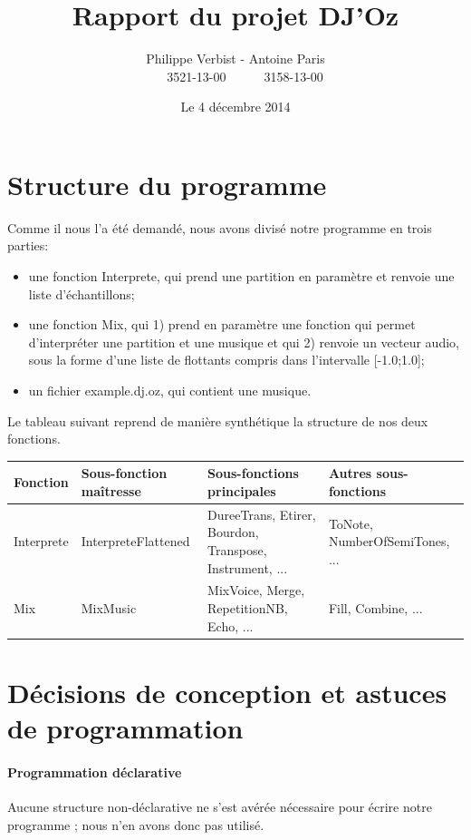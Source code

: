 \documentclass[10pt,a4paper]{article}
\author{Philippe Verbist - Antoine Paris \\ \ \ \ 3521-13-00\ \ \ \ \ \ 3158-13-00}
\title{\textbf{Rapport du projet DJ'Oz}}
\date{Le 4 décembre 2014}
\begin{document}
\sloppy
\maketitle

\section{Structure du programme}
Comme il nous l'a été demandé, nous avons divisé notre programme en trois parties:
\begin{itemize}
	\item une fonction Interprete, qui prend une partition en paramètre et renvoie une liste d'échantillons;
	\item une fonction Mix, qui 1) prend en paramètre une fonction qui permet d'interpréter une partition 
	et une musique et qui  2) renvoie un vecteur audio, sous la forme d'une liste de flottants compris dans l'intervalle [-1.0;1.0];
	\item un fichier example.dj.oz, qui contient une musique.
\end{itemize}
\vspace{0.5 cm}

Le tableau suivant reprend de manière synthétique la structure de nos deux fonctions.

\begin{center}
		\begin{tabular}{|p{}|p{}|p{}|p{}|}
		\hline
		\textbf{Fonction}		& \textbf{Sous-fonction maîtresse} 	& \textbf{Sous-fonctions principales} 										& \textbf{Autres sous-fonctions}	\\
		\hline
		Interprete					& InterpreteFlattened								& DureeTrans, Etirer, Bourdon, Transpose, Instrument, ... & ToNote, NumberOfSemiTones, ...	\\
		\hline
		Mix 								& MixMusic 													& MixVoice, Merge, RepetitionNB, Echo, ... 								&  Fill, Combine, ...							\\
		\hline 
		\end{tabular}
\end{center}
	
\section{Décisions de conception et astuces de programmation}
\paragraph{Programmation déclarative} 
Aucune structure non-déclarative ne s'est avérée nécessaire
pour écrire notre programme ; nous n'en avons donc pas utilisé.
\end{document}
